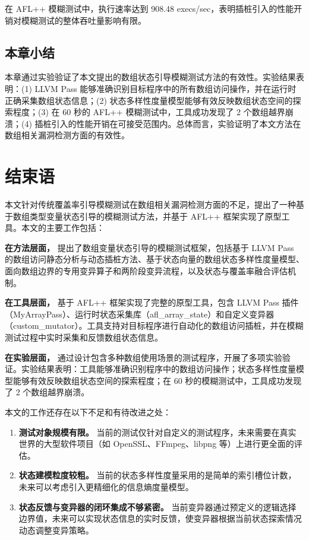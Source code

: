 \documentclass[bachelor]{njupthesis}
\begin{document}
在 AFL++ 模糊测试中，执行速率达到 908.48 execs/sec，表明插桩引入的性能开销对模糊测试的整体吞吐量影响有限。

\section{本章小结}

本章通过实验验证了本文提出的数组状态引导模糊测试方法的有效性。实验结果表明：(1) LLVM Pass 能够准确识别目标程序中的所有数组访问操作，并在运行时正确采集数组状态信息；(2) 状态多样性度量模型能够有效反映数组状态空间的探索程度；(3) 在 60 秒的 AFL++ 模糊测试中，工具成功发现了 2 个数组越界崩溃；(4) 插桩引入的性能开销在可接受范围内。总体而言，实验证明了本文方法在数组相关漏洞检测方面的有效性。

\thesisconclusion

\chapter*{结束语}

本文针对传统覆盖率引导模糊测试在数组相关漏洞检测方面的不足，提出了一种基于数组类型变量状态引导的模糊测试方法，并基于 AFL++ 框架实现了原型工具。本文的主要工作包括：

\textbf{在方法层面，} 提出了数组变量状态引导的模糊测试框架，包括基于 LLVM Pass 的数组访问静态分析与动态插桩方法、基于状态向量的数组状态多样性度量模型、面向数组边界的专用变异算子和两阶段变异流程，以及状态与覆盖率融合评估机制。

\textbf{在工具层面，} 基于 AFL++ 框架实现了完整的原型工具，包含 LLVM Pass 插件（MyArrayPass）、运行时状态采集库（afl\_array\_state）和自定义变异器（custom\_mutator）。工具支持对目标程序进行自动化的数组访问插桩，并在模糊测试过程中实时采集和反馈数组状态信息。

\textbf{在实验层面，} 通过设计包含多种数组使用场景的测试程序，开展了多项实验验证。实验结果表明：工具能够准确识别程序中的数组访问操作；状态多样性度量模型能够有效反映数组状态空间的探索程度；在 60 秒的模糊测试中，工具成功发现了 2 个数组越界崩溃。

本文的工作还存在以下不足和有待改进之处：

\begin{enumerate}
    \item \textbf{测试对象规模有限。} 当前的测试仅针对自定义的测试程序，未来需要在真实世界的大型软件项目（如 OpenSSL、FFmpeg、libpng 等）上进行更全面的评估。
    \item \textbf{状态建模粒度较粗。} 当前的状态多样性度量采用的是简单的索引槽位计数，未来可以考虑引入更精细化的信息熵度量模型。
    \item \textbf{状态反馈与变异器的闭环集成不够紧密。} 当前变异器通过预定义的逻辑选择边界值，未来可以实现状态信息的实时反馈，使变异器根据当前状态探索情况动态调整变异策略。
\end{enumerate}
\end{document}
